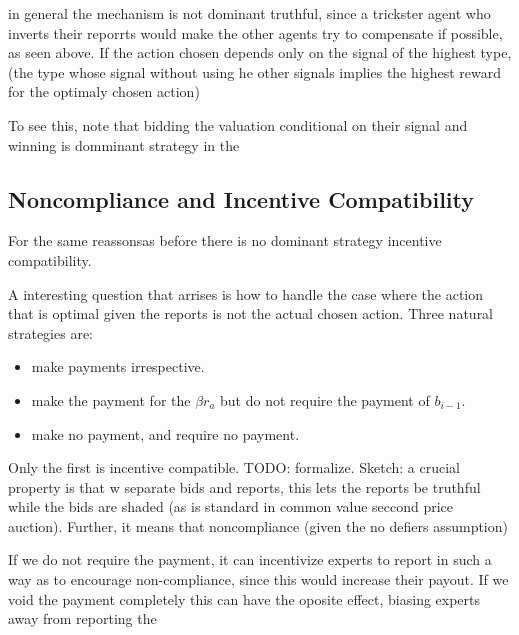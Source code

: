 in general the mechanism is not dominant truthful, since a trickster agent who inverts their reporrts would make the other agents try to compensate if possible, as seen above.
If the action chosen depends only on the signal of the highest type, (the type whose signal without using he other signals implies the highest reward for the optimaly chosen action) 

To see this, note that bidding the valuation conditional on their signal and winning is domminant strategy in the 

\subsection{Noncompliance and Incentive Compatibility}

For the same reassonsas before there is no dominant strategy incentive compatibility. 

A interesting question that arrises is how to handle the case where the action that is optimal given the reports is not the actual chosen action. Three natural strategies are:

\begin{itemize}
\item make payments irrespective. 
\item make the payment for the $\beta r_a$ but do not require the payment of $b_{i-1}$.
\item make no payment, and require no payment.
\end{itemize}

Only the first is incentive compatible. TODO: formalize. Sketch: a crucial property is that w separate bids and reports, this lets the reports be truthful while the bids are shaded (as is standard in common value seccond price auction). Further, it means that noncompliance (given the no defiers assumption) 

If we do not require the payment, it can incentivize experts to report in such a way as to encourage non-compliance, since this would increase their payout. 
If we void the payment completely this can have the oposite effect, biasing experts away from reporting the 







